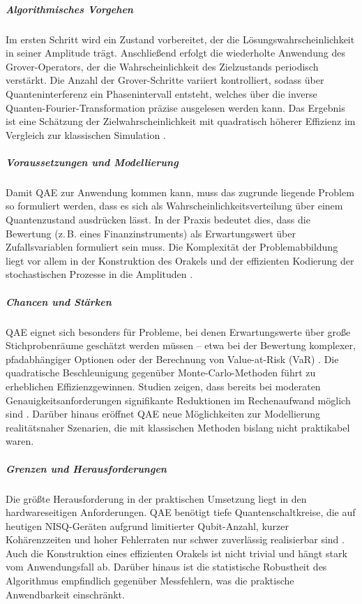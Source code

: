 \subparagraph{Algorithmisches Vorgehen}
Im ersten Schritt wird ein Zustand vorbereitet, der die Lösungswahrscheinlichkeit in seiner Amplitude trägt. Anschließend erfolgt die wiederholte Anwendung des Grover-Operators, der die Wahrscheinlichkeit des Zielzustands periodisch verstärkt. Die Anzahl der Grover-Schritte variiert kontrolliert, sodass über Quanteninterferenz ein Phasenintervall entsteht, welches über die inverse Quanten-Fourier-Transformation präzise ausgelesen werden kann. Das Ergebnis ist eine Schätzung der Zielwahrscheinlichkeit mit quadratisch höherer Effizienz im Vergleich zur klassischen Simulation \cite{quantumjournal2020, martin2022}.

\subparagraph{Voraussetzungen und Modellierung}
Damit QAE zur Anwendung kommen kann, muss das zugrunde liegende Problem so formuliert werden, dass es sich als Wahrscheinlichkeitsverteilung über einem Quantenzustand ausdrücken lässt. In der Praxis bedeutet dies, dass die Bewertung (z.\,B. eines Finanzinstruments) als Erwartungswert über Zufallsvariablen formuliert sein muss. Die Komplexität der Problemabbildung liegt vor allem in der Konstruktion des Orakels und der effizienten Kodierung der stochastischen Prozesse in die Amplituden \cite{rebentrost2018}.

\subparagraph{Chancen und Stärken}
QAE eignet sich besonders für Probleme, bei denen Erwartungswerte über große Stichprobenräume geschätzt werden müssen – etwa bei der Bewertung komplexer, pfadabhängiger Optionen oder der Berechnung von Value-at-Risk (VaR) \cite{orus_quantum_2019}. Die quadratische Beschleunigung gegenüber Monte-Carlo-Methoden führt zu erheblichen Effizienzgewinnen. Studien zeigen, dass bereits bei moderaten Genauigkeitsanforderungen signifikante Reduktionen im Rechenaufwand möglich sind \cite{rebentrost2018, egger2020}. Darüber hinaus eröffnet QAE neue Möglichkeiten zur Modellierung realitätsnaher Szenarien, die mit klassischen Methoden bislang nicht praktikabel waren.

\subparagraph{Grenzen und Herausforderungen}
Die größte Herausforderung in der praktischen Umsetzung liegt in den hardwareseitigen Anforderungen. QAE benötigt tiefe Quantenschaltkreise, die auf heutigen NISQ-Geräten aufgrund limitierter Qubit-Anzahl, kurzer Kohärenzzeiten und hoher Fehlerraten nur schwer zuverlässig realisierbar sind \cite{bouland_prospects_2020, martin2022}. Auch die Konstruktion eines effizienten Orakels ist nicht trivial und hängt stark vom Anwendungsfall ab. Darüber hinaus ist die statistische Robustheit des Algorithmus empfindlich gegenüber Messfehlern, was die praktische Anwendbarkeit einschränkt.


